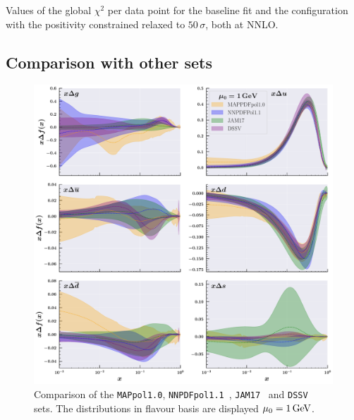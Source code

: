 \begin{table}
  \centering
  \small
  
  \caption{
    \small
    Values of the global $\chi^2$ per data point for the baseline fit and the configuration with the positivity constrained relaxed to $50 \, \sigma$, both at NNLO.
  \label{tab:positivity}}
\end{table}

\subsection{Comparison with other sets}

\begin{figure}[t!]
  \centering
  \includegraphics[width=\textwidth]{Chapters/Chapter_4/figs/competitors.pdf}
  \caption{\small{Comparison of the \texttt{MAPpol1.0}, \texttt{NNPDFpol1.1}~\cite{Nocera:2014gqa}, \texttt{JAM17}~\cite{Ethier:2017zbq} and \texttt{DSSV}~\cite{deFlorian:2008mr} sets. The distributions in flavour basis are displayed $\mu_0 = 1 \, \textrm{GeV}$. }}
  \label{fig:competitors}
\end{figure}